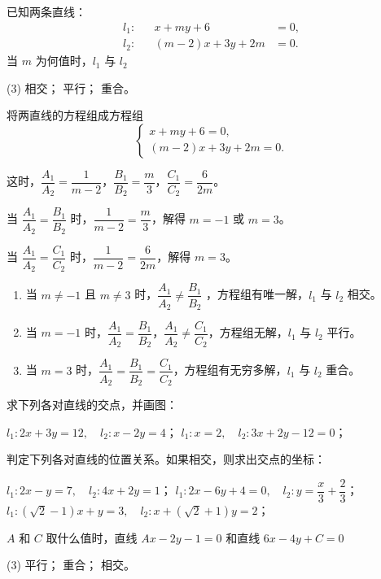 \medskip
\begin{example}
  已知两条直线：
  \begin{align*}
    l_1:&&x+my+6 & = 0,\\
    l_2:&&(m-2)x+3y+2m & = 0.
  \end{align*}
  当 $m$ 为何值时，${l}_{1}$ 与 ${l}_{2}$ 
  \begin{tasks}(3)
    \task 相交；
    \task 平行；
    \task 重合。
  \end{tasks}
\end{example}
\begin{solution}
  将两直线的方程组成方程组
  \[\begin{cases} x+my+6=0,\\(m-2)x+3y+2m=0. \end{cases}\]

  这时，$\dfrac{A_1}{A_2}=\dfrac{1}{m - 2}$，$\dfrac{B_1}{B_2} = \dfrac{m}{3}$，$\dfrac{C_1}{C_2} = \dfrac{6}{2m}$。

  \medskip 当 $\dfrac{A_1}{A_2}=\dfrac{B_1}{B_2}$ 时，$\dfrac{1}{m-2} = \dfrac{m}{3}$，解得 $m=-1$ 或 $m=3$。

\medskip 当 $\dfrac{A_1}{A_2}=\dfrac{C_1}{C_2}$ 时，$\dfrac{1}{m-2} = \dfrac{6}{2m}$，解得 $m=3$。
\begin{enumerate}
  \item 当 $m\neq-1$ 且 $m\neq 3$ 时，$\dfrac{A_1}{A_2} \neq \dfrac{B_1}{B_2}$ ，方程组有唯一解，$l_1$ 与 $l_2$ 相交。
  \item 当 $m=-1$ 时，$\dfrac{A_1}{A_2}= \dfrac{B_1}{B_2}$，$\dfrac{A_1}{A_2} \neq \dfrac{C_1}{C_2}$，方程组无解，$l_1$ 与 $l_2$ 平行。
  \item 当 $m=3$ 时，$\dfrac{A_1}{A_2}= \dfrac{B_1}{B_2}= \dfrac{C_1}{C_2}$，方程组有无穷多解，$l_1$ 与 $l_2$  重合。
\end{enumerate}
\end{solution}

\begin{Practice}
  \begin{question}
    \item 求下列各对直线的交点，并画图：
    \begin{tasks}
      \task $l_1:2x+3y=12,\quad l_2:x-2y=4$；
      \task $l_1:x=2,\quad l_2:3x+2y-12=0$；
    \end{tasks}
    \item 判定下列各对直线的位置关系。如果相交，则求出交点的坐标：
    \begin{tasks}
      \task $l_1:2x-y=7,\quad l_2:4x+2y=1$；
      \task $l_1:2x-6y+4=0,\quad l_2:y=\dfrac{x}{3}+\dfrac{2}{3}$；
      \task $l_1:(\sqrt{2}-1)x+y=3,\quad l_2:x+(\sqrt{2}+1)y=2$；
    \end{tasks}
    \item $A$ 和 $C$ 取什么值时，直线 $Ax-2y-1=0$ 和直线 $6x-4y+C=0$
    \begin{tasks}(3)
      \task 平行；
      \task 重合；
      \task 相交。
    \end{tasks} 
  \end{question}
\end{Practice}

